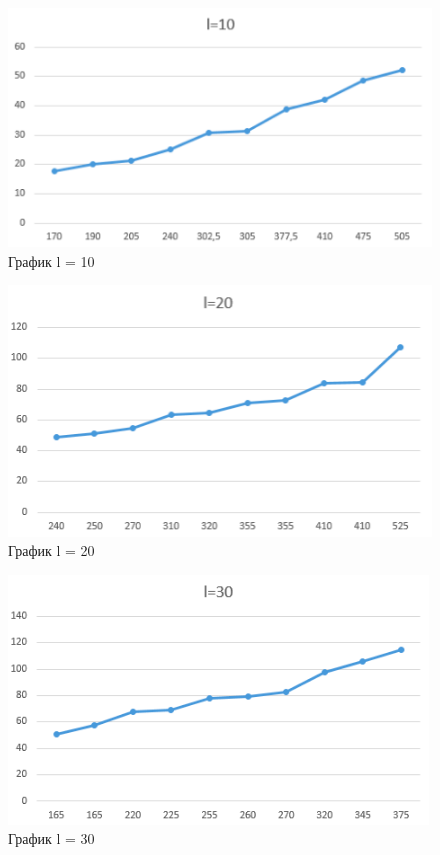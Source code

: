 \documentclass[14pt, a4paper]{scrartcl}
\begin{document}
\begin{figure}
\centering
\includegraphics[scale=1]{leq10.png}
\caption{График l = 10}
\label{fig:10len}
\end{figure}
\begin{figure}
\centering
\includegraphics[scale=1]{leq20.png}
\caption{График l = 20}
\label{fig:20len}
\end{figure}
\begin{figure}
\centering
\includegraphics[scale=1]{leq30.png}
\caption{График l = 30}
\label{fig:30len}
\end{figure}
\end{document}
